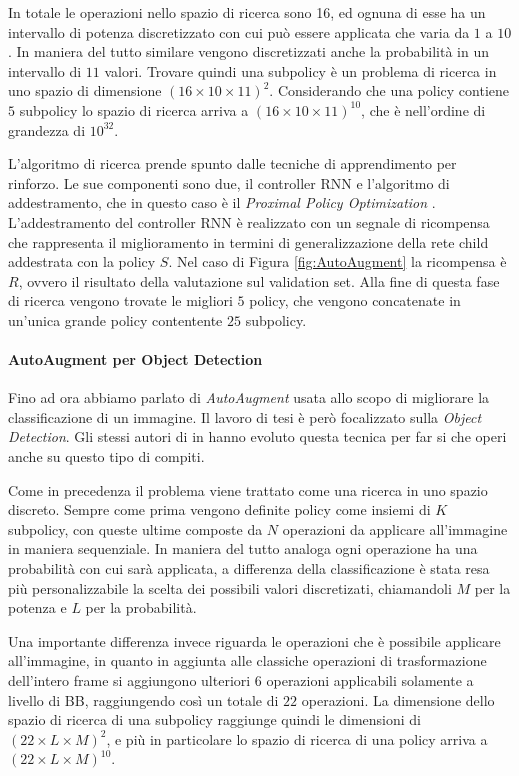 In totale le operazioni nello spazio di ricerca sono 16, ed ognuna di esse ha un intervallo di potenza discretizzato con cui può essere applicata che varia da $1$ a $10$. In maniera del tutto similare vengono discretizzati anche la probabilità in un intervallo di $11$ valori. Trovare quindi una subpolicy è un problema di ricerca in uno spazio di dimensione $(16 \times 10 \times 11)^2$. Considerando che una policy contiene $5$ subpolicy lo spazio di ricerca arriva a $(16 \times 10 \times 11)^{10}$, che è nell'ordine di grandezza di $10^{32}$.


L'algoritmo di ricerca prende spunto dalle tecniche di apprendimento per rinforzo. Le sue componenti sono due, il controller \ac{RNN} e l'algoritmo di addestramento, che in questo caso è il \textit{Proximal Policy Optimization} \cite{DBLP:journals/corr/SchulmanWDRK17}. L'addestramento del controller \ac{RNN} è realizzato con un segnale di ricompensa che rappresenta il miglioramento in termini di generalizzazione della rete child addestrata con la policy $S$. Nel caso di Figura \ref{fig:AutoAugment} la ricompensa è $R$, ovvero il risultato della valutazione sul validation set. Alla fine di questa fase di ricerca vengono trovate le migliori $5$ policy, che vengono concatenate in un'unica grande policy contentente $25$ subpolicy.
\paragraph{AutoAugment per Object Detection}
Fino ad ora abbiamo parlato di \textit{AutoAugment} usata allo scopo di migliorare la classificazione di un immagine. Il lavoro di tesi è però focalizzato sulla \textit{Object Detection}. Gli stessi autori di \cite{DBLP:journals/corr/abs-1805-09501} in \cite{DBLP:journals/corr/abs-1906-11172} hanno evoluto questa tecnica per far si che operi anche su questo tipo di compiti.


Come in precedenza il problema viene trattato come una ricerca in uno spazio discreto. Sempre come prima vengono definite policy come insiemi di $K$ subpolicy, con queste ultime composte da $N$ operazioni da applicare all'immagine in maniera sequenziale. In maniera del tutto analoga ogni operazione ha una probabilità con cui sarà applicata, a differenza della classificazione è stata resa più personalizzabile la scelta dei possibili valori discretizati, chiamandoli $M$ per la potenza e $L$ per la probabilità. 

Una importante differenza invece riguarda le operazioni che è possibile applicare all'immagine, in quanto in aggiunta alle classiche operazioni di trasformazione dell'intero frame si aggiungono ulteriori $6$ operazioni applicabili solamente a livello di \ac{BB}, raggiungendo così un totale di $22$ operazioni. La dimensione dello spazio di ricerca di una subpolicy raggiunge quindi le dimensioni di $(22 \times L \times M)^2$, e più in particolare lo spazio di ricerca di una policy arriva a $(22 \times L \times M)^{10}$.


